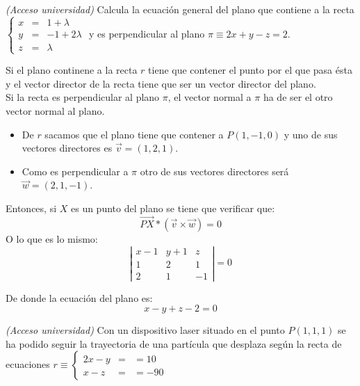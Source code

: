 \documentclass[a4paper,11pt,answers]{exam}
\begin{document}
\begin{questions}
\question \textit{(Acceso universidad)} Calcula la ecuación general del plano que contiene a la recta $\left\lbrace\begin{array}{lll}
x &=& 1 + \lambda\\y &=& -1 + 2\lambda\\z &=& \lambda
\end{array}\right.$ y es perpendicular al plano $\pi \equiv 2x + y - z = 2$.
\begin{solution}
Si el plano continene a la recta $r$ tiene que contener el punto por el que pasa ésta y el vector director de la recta tiene que ser un vector director del plano.\\
Si la recta es perpendicular al plano $\pi$, el vector normal a $\pi$ ha de ser el otro vector normal al plano.
\begin{itemize}
	\item De $r$ sacamos que el plano tiene que contener a $P(1,-1,0)$ y uno de sus vectores directores es $\vec v = (1,2,1)$.
	\item Como es perpendicular a $\pi$ otro de sus vectores directores será $\vec w = (2,1,-1)$.
\end{itemize}
Entonces, si $X$ es un punto del plano se tiene que verificar que:
\[\overrightarrow{PX}*(\vec v \times \vec w) = 0\]
O lo que es lo mismo:
\[\left|\begin{array}{rrr}
x-1&y+1&z\\1&2&1\\2&1&-1
\end{array}\right| = 0\]

De donde la ecuación del plano es:
\[x -y + z -2=0\]
\end{solution}

\question \textit{(Acceso universidad)} Con un dispositivo laser situado en el punto $P(1,1,1)$ se ha podido seguir la trayectoria de una partícula que desplaza según la recta de ecuaciones $r \equiv \left\lbrace\begin{array}{lll}
2x -y &=&= 10\\x - z &=&= -90
\end{array}\right.$
\end{questions}
\end{document}

